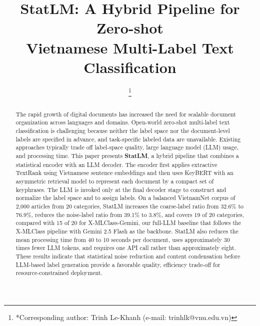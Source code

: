 \documentclass[conference]{IEEEtran}
\begin{document}
\title{StatLM: A Hybrid Pipeline for Zero-shot\\
Vietnamese Multi-Label Text Classification}

\author{
\and
{}
\thanks{*Corresponding author: Trinh Le-Khanh (e-mail: trinhlk@vnu.edu.vn)}

}

\maketitle

\begin{abstract}
The rapid growth of digital documents has increased the need for scalable document organization across languages and domains.
Open-world zero-shot multi-label text classification is challenging because neither the label space nor the document-level labels are specified in advance, and task-specific labeled data are unavailable. Existing approaches typically trade off label-space quality, large language model (LLM) usage, and processing time. This paper presents \textbf{StatLM}, a hybrid pipeline that combines a statistical encoder with an LLM decoder. The encoder first applies extractive TextRank using Vietnamese sentence embeddings and then uses KeyBERT with an asymmetric retrieval model to represent each document by a compact set of keyphrases. The LLM is invoked only at the final decoder stage to construct and normalize the label space and to assign labels. On a balanced VietnamNet corpus of 2{,}000 articles from 20 categories, StatLM increases the coarse-label ratio from 32.6\% to 76.9\%, reduces the noise-label ratio from 39.1\% to 3.8\%, and covers 19 of 20 categories, compared with 15 of 20 for X-MLClass-Gemini, our full-LLM baseline that follows the X-MLClass pipeline with Gemini 2.5 Flash as the backbone. StatLM also reduces the mean processing time from 40 to 10 seconds per document, uses approximately $30$ times fewer LLM tokens, and requires one API call rather than approximately eight. These results indicate that statistical noise reduction and content condensation before LLM-based label generation provide a favorable quality, efficiency trade-off for resource-constrained deployment.
\end{abstract}
\end{document}
